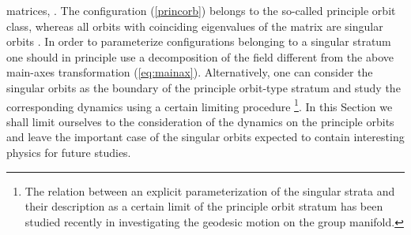 \documentclass[a4paper,12pt]{article}
\begin{document}
matrices, \coordHE{}.
The configuration (\ref{princorb}) belongs to the so-called  principle orbit
class,
whereas all orbits with coinciding eigenvalues of the matrix \coordHE{} are
singular orbits \cite{ORaf}.
In order to parameterize configurations belonging to a singular stratum
one should in principle use a decomposition of the \coordHE{} field different from the
above main-axes transformation (\ref{eq:mainax}).
Alternatively, one can consider the singular orbits as the boundary of the
principle orbit-type stratum and study the corresponding dynamics using a
certain limiting procedure
\footnote{The relation between an explicit parameterization
of the singular strata and their description as a certain limit
of the principle orbit stratum has been studied recently in \cite{AD}
investigating the geodesic motion on the \coordHE{} group manifold.}.
In this Section we shall limit ourselves to the consideration of the dynamics
on the principle orbits and leave the important case of the singular orbits
expected to contain interesting physics for future studies.
\end{document}
